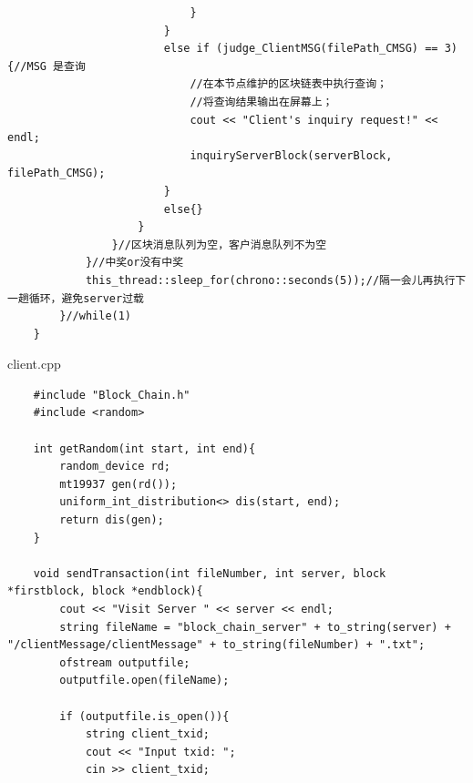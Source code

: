 \documentclass[10pt,a4paper]{article}
\begin{document}
\begin{verbatim}
                            }
                        }
                        else if (judge_ClientMSG(filePath_CMSG) == 3){//MSG 是查询
                            //在本节点维护的区块链表中执行查询；
                            //将查询结果输出在屏幕上；
                            cout << "Client's inquiry request!" << endl;
                            inquiryServerBlock(serverBlock, filePath_CMSG);
                        }
                        else{}
                    }
                }//区块消息队列为空，客户消息队列不为空
            }//中奖or没有中奖
            this_thread::sleep_for(chrono::seconds(5));//隔一会儿再执行下一趟循环，避免server过载
        }//while(1)
    }        
    \end{verbatim}
    
    \noindent client.cpp
    \begin{verbatim}
    #include "Block_Chain.h"
    #include <random>
    
    int getRandom(int start, int end){
        random_device rd;
        mt19937 gen(rd());
        uniform_int_distribution<> dis(start, end);
        return dis(gen);
    }
    
    void sendTransaction(int fileNumber, int server, block *firstblock, block *endblock){
        cout << "Visit Server " << server << endl;
        string fileName = "block_chain_server" + to_string(server) + "/clientMessage/clientMessage" + to_string(fileNumber) + ".txt";
        ofstream outputfile;
        outputfile.open(fileName);
    
        if (outputfile.is_open()){
            string client_txid;
            cout << "Input txid: ";
            cin >> client_txid;
    

\end{verbatim}
\end{document}
